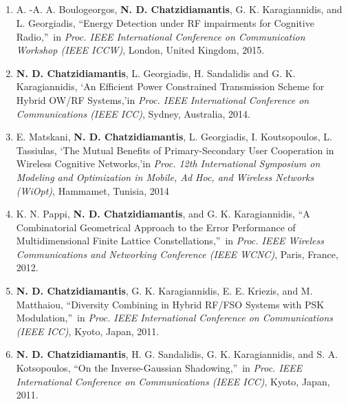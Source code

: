 \documentclass[11pt]{article}
\begin{document}
\subsection{}
\latintext
\renewcommand{\labelenumi}{[C\arabic{enumi}]}
\begin{enumerate}

\item A. -A. A. Boulogeorgos, \textbf{N. D. Chatzidiamantis}, G. K. Karagiannidis, and L. Georgiadis, \textquotedblleft Energy Detection under RF impairments for Cognitive Radio,\textquotedblright\ in \emph{Proc. IEEE International Conference on Communication Workshop (IEEE ICCW)}, London, United Kingdom, 2015.
\item	\textbf{N. D. Chatzidiamantis}, L. Georgiadis, H. Sandalidis and G. K. Karagiannidis, \textquoteleft An Efficient Power Constrained Transmission Scheme for Hybrid OW/RF Systems,\textquoteright in \emph{Proc. IEEE International Conference on Communications (IEEE ICC)}, Sydney, Australia, 2014.
\item E. Matskani, \textbf{N. D. Chatzidiamantis}, L. Georgiadis, I. Koutsopoulos, L. Tassiulas, \textquoteleft The Mutual Benefits of Primary-Secondary User Cooperation in Wireless Cognitive Networks,\textquoteright in \emph{Proc. 12th International Symposium on Modeling and Optimization in Mobile, Ad Hoc, and Wireless Networks (WiOpt)}, Hammamet, Tunisia, 2014

\item K. N. Pappi, \textbf{N. D. Chatzidiamantis}, and G. K. Karagiannidis, \textquotedblleft A
Combinatorial Geometrical Approach to the Error Performance of Multidimensional Finite Lattice
Constellations,\textquotedblright\ in \emph{Proc. IEEE Wireless Communications and Networking Conference (IEEE
WCNC)}, Paris, France, 2012.

\item  \textbf{N. D. Chatzidiamantis}, G. K. Karagiannidis, E. E. Kriezis, and M. Matthaiou,
\textquotedblleft Diversity Combining in Hybrid RF/FSO Systems with PSK
Modulation,\textquotedblright\ in \emph{Proc. IEEE International Conference on Communications (IEEE ICC)}, Kyoto,
Japan, 2011.

\item  \textbf{N. D. Chatzidiamantis}, H. G. Sandalidis, G. K. Karagiannidis, and S. A. Kotsopoulos,
\textquotedblleft On the Inverse-Gaussian Shadowing,\textquotedblright\ in \emph{Proc. IEEE
International Conference on Communications (IEEE ICC)}, Kyoto, Japan, 2011.


\end{enumerate}
\end{document}
